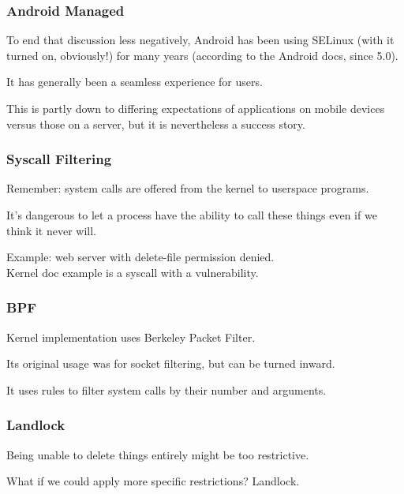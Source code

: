 \begin{frame}
\frametitle{Android Managed}

To end that discussion less negatively, Android has been using SELinux (with it turned on, obviously!) for many years (according to the Android docs, since 5.0).

It has generally been a seamless experience for users. 

This is partly down to differing expectations of applications on mobile devices versus those on a server, but it is nevertheless a success story.

\end{frame}


\begin{frame}
\frametitle{Syscall Filtering}

Remember: system calls are offered from the kernel to userspace programs.

It's dangerous to let a process have the ability to call these things even if we think it never will. 

Example: web server with delete-file permission denied.\\
\quad Kernel doc example is a syscall with a vulnerability.

\end{frame}


\begin{frame}
\frametitle{BPF}

Kernel implementation uses Berkeley Packet Filter.

Its original usage was for socket filtering, but can be turned inward.

It uses rules to filter system calls by their number and arguments. 

\end{frame}


\begin{frame}
\frametitle{Landlock}

Being unable to delete things entirely might be too restrictive.

What if we could apply more specific restrictions? \alert{Landlock}.

\end{frame}



